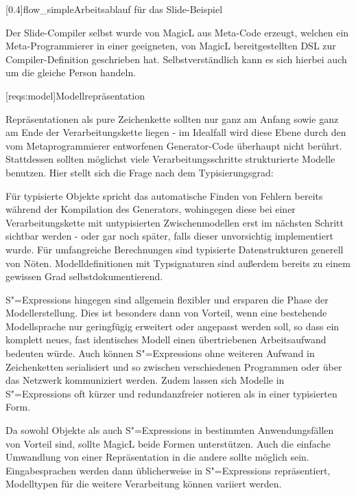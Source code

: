 \documentclass[11pt, a4paper, bibgerm]{scrbook}
\newcommand\lsection{}
\newcommand\fig{}
\newcommand{\sexps}{S"=Expressions}
\begin{document}
\fig[0.4]{flow_simple}{Arbeitsablauf für das Slide-Beispiel} 

Der Slide-Compiler selbst wurde von MagicL aus Meta-Code erzeugt,
welchen ein Meta-Programmierer in einer geeigneten, von MagicL
bereitgestellten DSL zur Compiler-Definition geschrieben
hat. Selbstverständlich kann es sich hierbei auch um die gleiche Person
handeln.

\lsection[reqs:model]{Modellrepräsentation}

Repräsentationen als pure Zeichenkette sollten nur ganz am Anfang sowie
ganz am Ende der Verarbeitungskette liegen - im Idealfall wird diese
Ebene durch den vom Metaprogrammierer entworfenen Generator-Code
überhaupt nicht berührt. Stattdessen sollten möglichst viele
Verarbeitungsschritte strukturierte Modelle benutzen. Hier stellt
sich die Frage nach dem Typisierungsgrad:

Für typisierte Objekte spricht das automatische Finden von Fehlern
bereits während der Kompilation des Generators, wohingegen diese bei
einer Verarbeitungskette mit untypisierten Zwischenmodellen erst im
nächsten Schritt sichtbar werden - oder gar noch später,
falls dieser unvorsichtig implementiert wurde. Für umfangreiche
Berechnungen sind typisierte Datenstrukturen generell
von Nöten. Modelldefinitionen mit Typsignaturen sind außerdem bereits zu
einem gewissen Grad selbstdokumentierend.

\sexps{} hingegen sind allgemein flexibler und ersparen die Phase der
Modellerstellung. Dies ist besonders dann von Vorteil, wenn eine
bestehende Modellsprache nur geringfügig erweitert oder angepasst werden
soll, so dass ein komplett neues, fast identisches Modell einen
übertriebenen Arbeitsaufwand bedeuten würde. Auch können \sexps{} ohne
weiteren Aufwand in Zeichenketten serialisiert und so zwischen
verschiedenen Programmen oder über das Netzwerk kommuniziert
werden. Zudem lassen sich Modelle in \sexps{} oft kürzer und
redundanzfreier notieren als in einer typisierten Form.

Da sowohl Objekte als auch \sexps{} in bestimmten Anwendungsfällen von
Vorteil sind, sollte MagicL beide Formen unterstützen. Auch die
einfache Umwandlung von einer Repräsentation in die andere sollte
möglich sein. Eingabesprachen werden dann üblicherweise in \sexps{}
repräsentiert, Modelltypen für die weitere Verarbeitung können variiert
werden.
\end{document}
